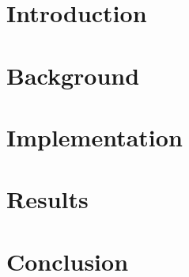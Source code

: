 \documentclass[11pt]{report}
\begin{document}
\tableofcontents

\chapter{Introduction}


\chapter{Background}


\chapter{Implementation}


\chapter{Results}


\chapter{Conclusion}

\printbibliography


\end{document}
